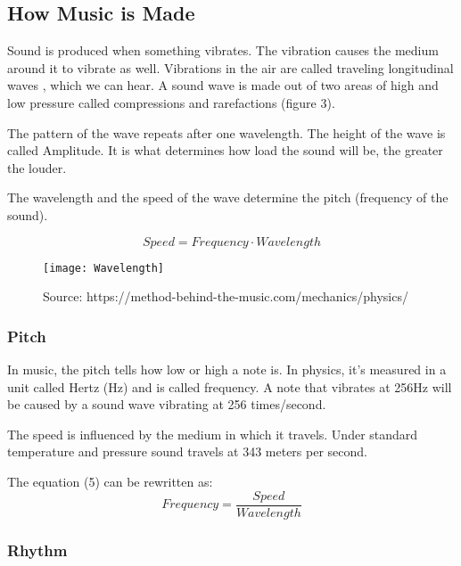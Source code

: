 \subsection{How Music is Made}
\par
Sound is produced when something vibrates. The vibration causes the medium around it to vibrate as well. Vibrations in the air are called traveling longitudinal waves \cite{physics_of_sound}, which we can hear.
A sound wave is made out of two areas of high and low pressure called compressions and rarefactions (figure 3). \par

The pattern of the wave repeats after one wavelength. The height of the wave is called Amplitude. It is what determines how load the sound will be, the greater the louder.

The wavelength and the speed of the wave determine the pitch (frequency of the sound). \par 


\begin{equation}
Speed = Frequency \cdot Wavelength
\end{equation}

\begin{figure}[h]
	\centering
	\texttt{[image: Wavelength]}
	\caption[Traveling Wave]{
		Source: https://method-behind-the-music.com/mechanics/physics/ }
\end{figure}

\subsubsection{Pitch}
In music, the pitch tells how low or high a note is. In physics, it's measured in a unit called Hertz (Hz) and is called frequency. A note that vibrates at 256Hz will be caused by a sound wave vibrating at 256 times/second. \par

The speed is influenced by the medium in which it travels. Under standard temperature and pressure sound travels at 343 meters per second. \cite{speed_of_sound}

The equation (5) can be rewritten as:
\begin{equation}
Frequency = \dfrac{Speed}{Wavelength}
\end{equation}

\subsubsection{Rhythm}
